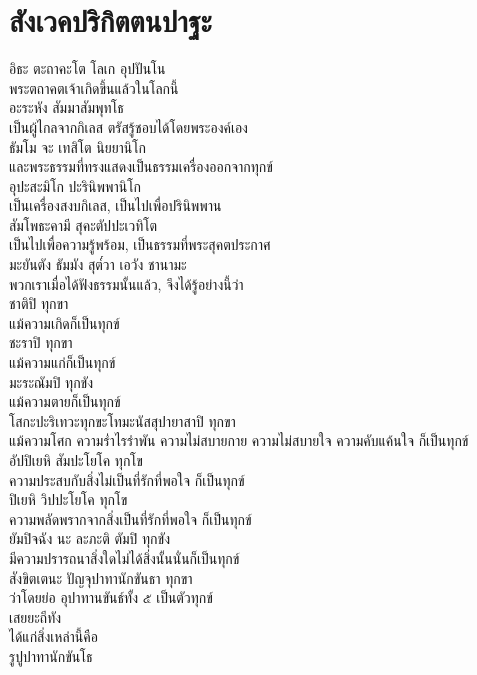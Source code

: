 \documentclass{article}
\begin{document}
\section{สังเวคปริกิตตนปาฐะ}
อิธะ ตะถาคะโต โลเก อุปปันโน\\
\indent พระตถาคตเจ้าเกิดขึ้นแล้วในโลกนี้\\
อะระหัง สัมมาสัมพุทโธ\\
\indent เป็นผู้ไกลจากกิเลส ตรัสรู้ชอบได้โดยพระองค์เอง\\
ธัมโม จะ เทสิโต นิยยานิโก\\
\indent และพระธรรมที่ทรงแสดงเป็นธรรมเครื่องออกจากทุกข์\\
อุปะสะมิโก ปะรินิพพานิโก\\
\indent เป็นเครื่องสงบกิเลส, เป็นไปเพื่อปรินิพพาน\\
สัมโพธะคามี สุคะตัปปะเวทิโต\\
\indent เป็นไปเพื่อความรู้พร้อม, เป็นธรรมที่พระสุคตประกาศ\\
มะยันตัง ธัมมัง สุต๎วา เอวัง ชานามะ\\
\indent พวกเราเมื่อได้ฟังธรรมนั้นแล้ว, จึงได้รู้อย่างนี้ว่า\\
ชาติปิ ทุกขา\\
\indent แม้ความเกิดก็เป็นทุกข์\\
ชะราปิ ทุกขา\\
\indent แม้ความแก่ก็เป็นทุกข์\\
มะระณัมปิ ทุกขัง\\
\indent แม้ความตายก็เป็นทุกข์\\
โสกะปะริเทวะทุกขะโทมะนัสสุปายาสาปิ ทุกขา\\
\indent แม้ความโศก ความร่ำไรรำพัน ความไม่สบายกาย
ความไม่สบายใจ ความคับแค้นใจ ก็เป็นทุกข์\\
อัปปิเยหิ สัมปะโยโค ทุกโข\\
\indent ความประสบกับสิ่งไม่เป็นที่รักที่พอใจ ก็เป็นทุกข์\\
ปิเยหิ วิปปะโยโค ทุกโข\\
\indent ความพลัดพรากจากสิ่งเป็นที่รักที่พอใจ ก็เป็นทุกข์\\
ยัมปิจฉัง นะ ละภะติ ตัมปิ ทุกขัง\\
\indent มีความปรารถนาสิ่งใดไม่ได้สิ่งนั้นนั่นก็เป็นทุกข์\\
สังขิตเตนะ ปัญจุปาทานักขันธา ทุกขา\\
\indent ว่าโดยย่อ อุปาทานขันธ์ทั้ง ๕ เป็นตัวทุกข์\\
เสยยะถีทัง\\
\indent ได้แก่สิ่งเหล่านี้คือ\\
รูปูปาทานักขันโธ\\
\end{document}
